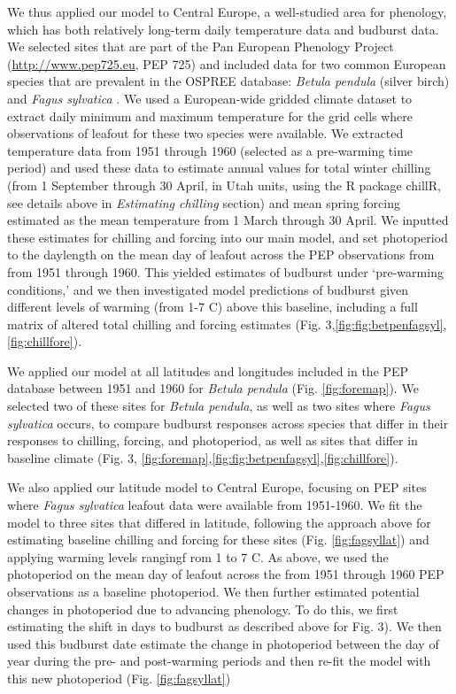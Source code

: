 \documentclass{article}
\begin{document}
\par We thus applied our model to Central Europe, a well-studied area for phenology, which has both relatively long-term daily temperature data and budburst data. We selected sites that are part of the Pan European Phenology Project (\url{http://www.pep725.eu}, PEP 725) and included data for two common European species that are prevalent in the OSPREE database: \emph{Betula pendula} (silver birch) and \emph{Fagus sylvatica} \citep{Templ2018}. We used a European-wide gridded climate dataset \citep{cornes2018} to extract daily minimum and maximum temperature for the grid cells where observations of leafout for these two species were available. We extracted temperature data from 1951 through 1960 (selected as a pre-warming time period) and used these data to estimate annual values for total winter chilling (from 1 September through 30 April, in Utah units, using the R package chillR, see details above in \emph{Estimating chilling} section) and mean spring forcing estimated as the mean temperature from 1 March through 30 April. We inputted these estimates for chilling and forcing into our main model, and set photoperiod to the daylength on the mean day of leafout across the PEP observations from from 1951 through 1960. This yielded estimates of budburst under `pre-warming conditions,' and we then investigated model predictions of budburst given different levels of warming (from 1-7 \degree C) above this baseline, including a full matrix of altered total chilling and forcing estimates (Fig. 3,\ref{fig:fig:betpenfagsyl},\ref{fig:chillfore}). %
\par We applied our model at all latitudes and longitudes included in the PEP database between 1951 and 1960 for \emph{Betula pendula} (Fig. \ref{fig:foremap}). We selected two of these sites for \emph{Betula pendula}, as well as two sites where \emph{Fagus sylvatica} occurs, to compare budburst responses across species that differ in their responses to chilling, forcing, and photoperiod, as well as sites that differ in baseline climate (Fig. 3, \ref{fig:foremap},\ref{fig:fig:betpenfagsyl},\ref{fig:chillfore}).
\par We also applied our latitude model to Central Europe, focusing on PEP sites where \emph{Fagus sylvatica} leafout data were available from 1951-1960. We fit the model to three sites that differed in latitude, following the approach above for estimating baseline chilling and forcing for these sites (Fig. \ref{fig:fagsyllat}) and applying warming levels rangingf rom 1 to 7 \degree C.   As above, we used the photoperiod on the mean day of leafout across the from 1951 through 1960 PEP observations as a baseline photoperiod. We then further estimated potential changes in photoperiod due to advancing phenology. To do this, we first estimating the shift in days to budburst as described above for Fig. 3). %
We then used this budburst date estimate the change in photoperiod between the day of year during the pre- and post-warming periods and then re-fit the model with this new photoperiod (Fig. \ref{fig:fagsyllat})
\end{document}
